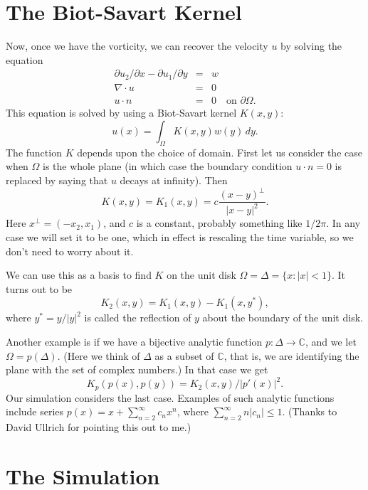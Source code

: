 \documentclass[12pt]{article}
\begin{document}
\section{The Biot-Savart Kernel}

Now, once we have the vorticity, we can recover the velocity $u$ by
solving the equation
\begin{eqnarray*}
\partial u_2/\partial x - \partial u_1/\partial y &=& w \\
\nabla \cdot u &=& 0 \\
u \cdot n &=& 0 \quad \text{on $\partial \Omega$}.
\end{eqnarray*}
This equation is solved by using a Biot-Savart kernel $K(x,y)$:
$$ u(x) = \int_\Omega K(x,y) w(y) \, dy .$$
The function $K$ depends upon the choice of domain.  First let us consider
the case when $\Omega$ is the whole plane (in which case the boundary
condition $u \cdot n = 0$ is replaced by saying that $u$ decays at infinity).
Then
\begin{equation*}
K(x,y) = K_1(x,y) = c \frac{(x-y)^\perp}{|x-y|^2} .
\end{equation*}
Here $x^\perp = (-x_2,x_1)$, and $c$ is a constant, probably something
like $1/2\pi$.  In any case we will set it to be one, which in effect
is rescaling the time variable, so we don't need to worry about it.

We can use this as a basis to find $K$ on the unit disk
$\Omega = \Delta = \{x:|x|<1\}$.  It turns out to be
\begin{equation*}
K_2(x,y) = K_1(x,y) - K_1(x,y^*) ,
\end{equation*}
where $y^* = y/|y|^2$ is called the reflection of $y$ about the
boundary of the unit disk.

Another example is if we have a bijective analytic function
$p:\Delta \to {\mathbb C}$, and we let $\Omega = p(\Delta)$.
(Here we think of $\Delta$ as a subset of $\mathbb C$, that is,
we are identifying the plane with the set of complex numbers.)
In that case we get
\[ K_p(p(x),p(y)) = K_2(x,y)/|p'(x)|^2 .\]
Our simulation considers the last case.  Examples of such
analytic functions include series 
$p(x) = x + \sum_{n=2}^\infty c_n x^n$, where
$\sum_{n=2}^\infty n |c_n| \le 1$.
(Thanks to David Ullrich for pointing this out to me.)

\section{The Simulation}
\end{document}
